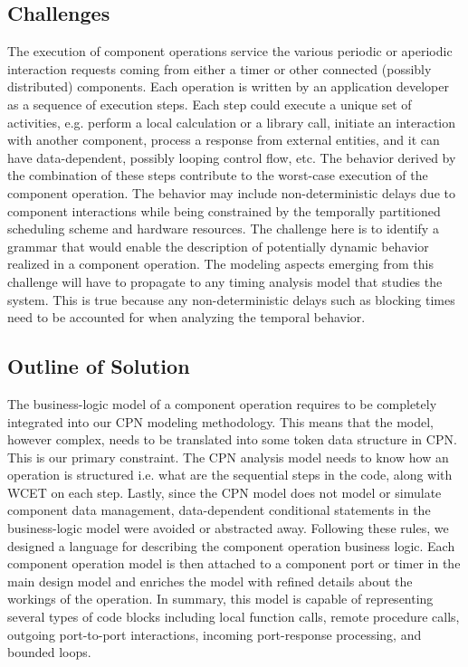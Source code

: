 \subsection{Challenges}

The execution of component operations service the various periodic or aperiodic interaction requests coming from either a timer or other connected (possibly distributed) components. Each operation is written by an application developer as a sequence of execution steps. Each step could execute a unique set of activities, e.g. perform a local calculation or a library call, initiate an interaction with another component, process a response from external entities, and it can have data-dependent, possibly looping control flow, etc. The behavior derived by the combination of these steps contribute to the worst-case execution of the component operation. The behavior may include non-deterministic delays due to component interactions while being constrained by the temporally partitioned scheduling scheme and hardware resources. The challenge here is to identify a grammar that would enable the description of potentially dynamic behavior realized in a component operation. The modeling aspects emerging from this challenge will have to propagate to any timing analysis model that studies the system. This is true because any non-deterministic delays such as blocking times need to be accounted for when analyzing the temporal behavior.

\subsection{Outline of Solution}
The business-logic model of a component operation requires to be completely integrated into our CPN modeling methodology. This means that the model, however complex, needs to be translated into some token data structure in CPN. This is our primary constraint. The CPN analysis model needs to know how an operation is structured i.e. what are the sequential steps in the code, along with WCET on each step. Lastly, since the CPN model does not model or simulate component data management, data-dependent conditional statements in the business-logic model were avoided or abstracted away. Following these rules, we designed a language for describing the component operation business logic. Each component operation model is then attached to a component port or timer in the main design model and enriches the model with refined details about the workings of the operation. In summary, this model is capable of representing several types of code blocks including local function calls, remote procedure calls, outgoing port-to-port interactions, incoming port-response processing, and bounded loops.

